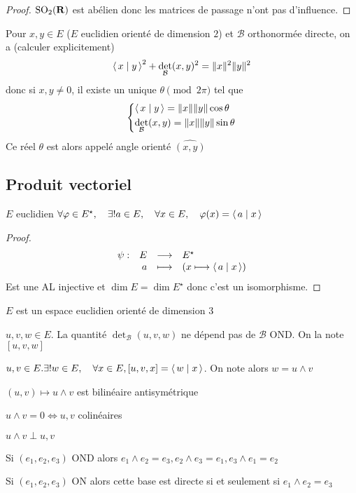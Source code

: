 \begin{proof}
    $\mathrm {SO}_2(\mathbf R)$ est abélien donc les matrices de passage n'ont pas d'influence.
\end{proof}

\begin{rem}
    Pour $x, y \in  E$ ($E$ euclidien orienté de dimension  $2$) et $\mathcal  B$ orthonormée directe, on a (calculer explicitement) \[
        \scalar{x}{y} ^2 + \det_{\mathcal  B}(x, y)^2 = \|x\|^2 \|y\|^2 
    \] 
    donc si $x, y\neq 0$, il existe un unique $\theta \pmod{2\pi}$ tel que \[
    \begin{dcases}
        \scalar{x}{y} = \|x\|\|y\|\cos \theta \\
        \det_{\mathcal  B}(x, y)= \|x\|\|y\|\sin \theta
    \end{dcases}
    \] 
    Ce réel $\theta$ est alors appelé angle orienté  $\widehat{(x, y)}$
\end{rem}

\subsection{Produit vectoriel}

\begin{thm}
\Hyp $E$ euclidien
\Conc $\forall \varphi \in  E^\star, \quad  \exists  ! a \in  E, \quad  \forall  x \in  E, \quad  \varphi(x)=\scalar{a}{x} $
\end{thm}

\begin{proof}
    \[
    \begin{array}{rrcl}
        \psi:& E & \longrightarrow &  E^\star \\
             & a & \longmapsto & \displaystyle (x \longmapsto \scalar{a}{x} )
    \end{array}
    \] 
    Est une AL injective et $\dim E=\dim E^\star$ donc c'est un isomorphisme.
\end{proof}

\begin{thmdef}
\Hyp $E$ est un espace euclidien orienté de dimension  $3$
 \begin{concenum}
 \item $u, v, w \in  E$. La quantité $\det_{\mathcal  B}(u,v,w)$ ne dépend pas de $ \mathcal  B$ OND. On la note $[u, v, w]$
 \item  $u, v \in  E. \exists !w \in  E, \quad  \forall  x \in  E, [u, v, x]= \scalar{w}{x} $. On note alors $w=u\wedge v$
 \item  $(u,v)\longmapsto u\wedge v$ est bilinéaire antisymétrique
 \item $u\wedge v=0 \iff  u,v$ colinéaires
 \item $u\wedge v\perp u,v$
 \item Si  $(e_1, e_2, e_3)$ OND alors  $e_1\wedge e_2=e_3, e_2\wedge e_3=e_1, e_3\wedge e_1=e_2$
 \item Si  $(e_1, e_2, e_3)$ ON alors cette base est directe  si et seulement si $e_1\wedge e_2=e_3$
\end{concenum}
\end{thmdef}

